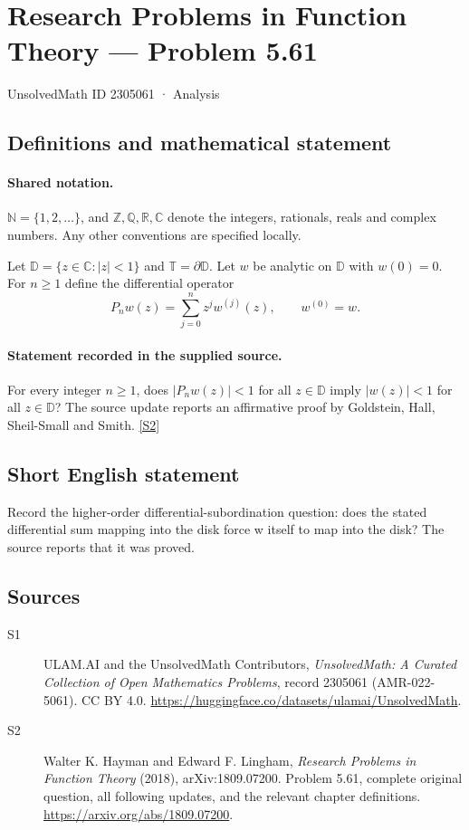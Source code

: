 \documentclass[11pt]{book}
\newcommand{\sref}[2]{\hyperlink{source:#1:#2}{[S#2]}}
\begin{document}
\setcounter{section}{2305060}
\section{Research Problems in Function Theory — Problem 5.61}\label{2305061}
{\small\sffamily UnsolvedMath ID 2305061 · Analysis}
\subsection{Definitions and mathematical statement}

\paragraph{Shared notation.}$\mathbb N=\{1,2,\ldots\}$, and $\mathbb Z,\mathbb Q,\mathbb R,\mathbb C$ denote the integers, rationals, reals and complex numbers. Any other conventions are specified locally.


Let $\mathbb D=\{z\in\mathbb C:|z|<1\}$ and $\mathbb T=\partial\mathbb D$. Let $w$ be analytic on $\mathbb D$ with $w(0)=0$. For $n\ge1$ define the differential operator \[P_nw(z)=\sum_{j=0}^{n}z^jw^{(j)}(z),\qquad w^{(0)}=w.\]
\paragraph{Statement recorded in the supplied source.}
For every integer $n\ge1$, does $|P_nw(z)|<1$ for all $z\in\mathbb D$ imply $|w(z)|<1$ for all $z\in\mathbb D$? The source update reports an affirmative proof by Goldstein, Hall, Sheil-Small and Smith. \sref{2305061}{2}
\subsection{Short English statement}
Record the higher-order differential-subordination question: does the stated differential sum mapping into the disk force w itself to map into the disk? The source reports that it was proved.
\subsection{Sources}
\begin{description}
\item[\hypertarget{source:2305061:1}{S1}] ULAM.AI and the UnsolvedMath Contributors, \emph{UnsolvedMath: A Curated Collection of Open Mathematics Problems}, record 2305061 (AMR-022-5061). CC BY 4.0. \url{https://huggingface.co/datasets/ulamai/UnsolvedMath}.
\item[\hypertarget{source:2305061:2}{S2}] Walter K. Hayman and Edward F. Lingham, \emph{Research Problems in Function Theory} (2018), arXiv:1809.07200. Problem 5.61, complete original question, all following updates, and the relevant chapter definitions. \url{https://arxiv.org/abs/1809.07200}.
\end{description}
\label{end:2305061}
\end{document}
